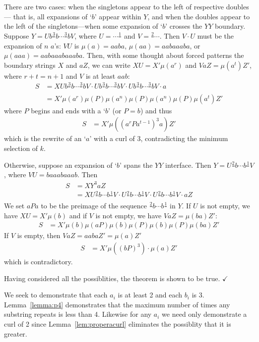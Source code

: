 \documentclass[11pt]{article}
\def\QED{$\checkmark$}
\def\ni{\noindent}
\def\s#1{\frac{#1}{}}
\def\q#1{`$#1$'}
\begin{document}
There are two cases: when the singletons appear to the left of respective doubles---
that is, all expansions of \q{b} appear within $Y$, and when the doubles appear to the left of the singletons---when some expansion of \q{b} crosses the $YY$ boundary.
Suppose $Y=Ub\s{3}b\cdots \s{3}bV$, where $U=\cdots\s{1}$ and $V=\s{2}\cdots$.  Then $V\cdot U$ must be the expansion of $n$ $a$'s: $VU$ is $\mu(a)=aaba$, $\mu(aa)=aabaaaba$, or $\mu(aaa)=aabaaabaaaba$.
Then, with some thought about forced patterns the boundary strings $X$ and $aZ$, we can write $XU=X'\mu(a^r)$ and $VaZ=\mu(a^t)Z'$, where
$r+t=n+1$ and $V$ is at least $aab$:
\begin{align*}
S&=XUb\s{3}b\cdots \s{3}bV\cdot Ub\s{3}b\cdots \s{3}bV\cdot  Ub\s{3}b\cdots \s{3}bV\cdot a\\
 &=X'\mu(a^r)\mu(P)\mu(a^n)\mu(P)\mu(a^n)\mu(P)\mu(a^t)Z'
\end{align*}
\ni where $P$ begins and ends with a \q{b} (or $P=b$) and thus
\begin{align*}
S &=X'\mu((a^rPa^{t-1})^3a)Z'
\end{align*}
\ni which is the rewrite of an \q{a} with a curl of 3, contradicting the minimum selection of $k$.

Otherwise, suppose an expansion of \q{b} spans the $YY$ interface.  Then $Y=U\s{2}b\cdots b\s{1}V$,
where $VU=baaabaaab$.  Then
\begin{align*}
S&=XY^3aZ\\
 &=XU\s{2}b\cdots b\s{1}V\cdot U\s{2}b\cdots b\s{1}V\cdot U\s{2}b\cdots b\s{1}V\cdot aZ
\end{align*}
\ni We set $aPa$ to be the preimage of the sequence $\s{2}b\cdots b\s{1}$ in $Y$. If $U$ is not empty, we have $XU=X'\mu(b)$ and if $V$ is not empty,
we have $VaZ=\mu(ba)Z'$:
\begin{align*}
S &=X'\mu(b)\mu(aP)\mu(b)\mu(P)\mu(b)\mu(P)\mu(ba)Z'
\end{align*}
\ni If $V$ is empty, then $VaZ=aabaZ'=\mu(a)Z'$
\begin{align*}
S &=X'\mu((bP)^3)\cdot \mu(a)Z'
\end{align*}
\ni which is contradictory.

Having considered all the possiblities, the theorem is shown to be true.
\QED

\ni{\bf Proof of Lemma~\ref{lem:abcurl}.} We seek to demonstrate that each $a_i$ is at least 2 and each $b_i$ is 3.
Lemma~\ref{lemma:p4} demonstrates that the maximum number of times any substring
repeats is less than 4.  Likewise for any $a_i$ we need only demonstrate a curl
of 2 since Lemma~\ref{lem:properacurl} eliminates the possiblity that it is greater.
\end{document}
